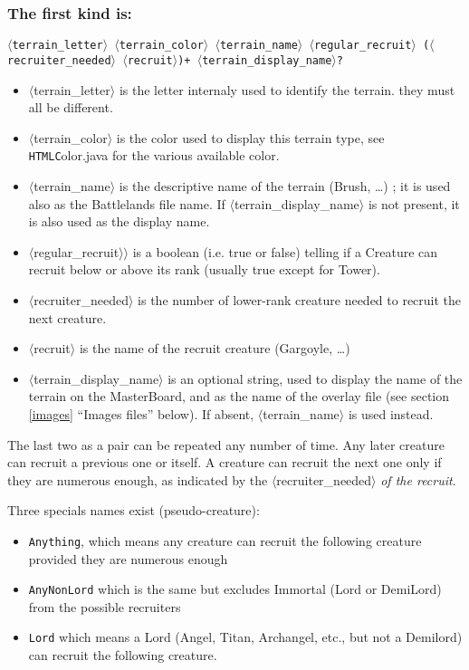 \documentclass{article}
\begin{document}
\subsubsection*{The first kind is:}

\texttt{$\langle$terrain\_letter$\rangle$ $\langle$terrain\_color$\rangle$ $\langle$terrain\_name$\rangle$ $\langle$regular\_recruit$\rangle$ ($\langle$recruiter\_needed$\rangle$ $\langle$recruit$\rangle$)+ $\langle$terrain\_display\_name$\rangle$?}

\begin{itemize}
\item $\langle$terrain\_letter$\rangle$ is the letter internaly used to identify the terrain. they must all be different.
\item $\langle$terrain\_color$\rangle$ is the color used to display this terrain type, see \texttt{HTMLC}olor.java for the various available color.
\item $\langle$terrain\_name$\rangle$ is the descriptive name of the terrain (Brush, \ldots) ; it is used also as the Battlelands file name. If $\langle$terrain\_display\_name$\rangle$ is not present, it is also used as the display name.
\item $\langle$regular\_recruit$\rangle$$\rangle$ is a boolean (i.e. true or false) telling if a Creature can recruit below or above its rank (usually true except for Tower).
\item $\langle$recruiter\_needed$\rangle$ is the number of lower-rank creature needed to recruit the next creature.
\item $\langle$recruit$\rangle$ is the name of the recruit creature (Gargoyle, \ldots)
\item $\langle$terrain\_display\_name$\rangle$ is an optional string, used to display the name of the terrain on the MasterBoard, and as the name of the overlay file (see section \ref{images} ``Images files'' below). If absent, $\langle$terrain\_name$\rangle$ is used instead.
\end{itemize}

The last two as a pair can be repeated any number of time. Any later creature can recruit a previous one or itself. A creature can recruit the next one only if they are numerous enough, as indicated by the $\langle$recruiter\_needed$\rangle$ \emph{of the recruit}.

Three specials names exist (pseudo-creature):
\begin{itemize}
\item \texttt{Anything}, which means any creature can recruit the following creature provided they are numerous enough
\item \texttt{AnyNonLord} which is the same but excludes Immortal (Lord or DemiLord) from the possible recruiters
\item \texttt{Lord} which means a Lord (Angel, Titan, Archangel, etc., but not a Demilord) can recruit the following creature.
\end{itemize}
\end{document}
